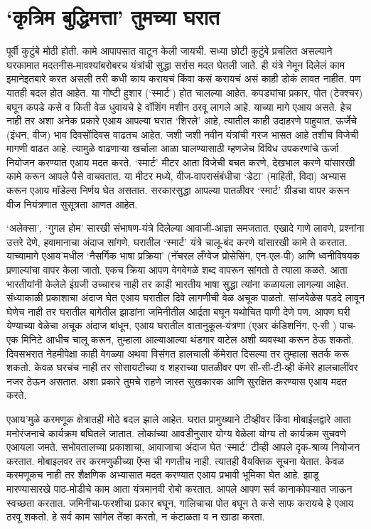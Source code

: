 \chapter{`कृत्रिम बुद्धिमत्ता' तुमच्या घरात}

पूर्वी कुटुंबे मोठी होती. कामे आपापसात वाटून केली जायची. सध्या छोटी कुटुंबे प्रचलित असल्याने घरकामात मदतनीस-मावश्यांबरोबरच यंत्रांची सुद्धा सर्रास मदत घेतली जाते. ही यंत्रे नेमून दिलेलं काम इमानेइतबारे करत असली तरी कधी काय करायचं किंवा कसं करायचं असं काही डोकं लावत नाहीत. पण यातही बदल होत आहेत. या गोष्टी हुशार (`स्मार्ट') होत चालल्या आहेत. कपड्यांचा प्रकार, पोत (टेक्श्चर) बघून कपडे कसे व किती वेळ धुवायचे हे वॉशिंग मशीन ठरवू लागले आहे. याच्या मागे एआय असते. हेच नाही तर अशा अनेक प्रकारे एआय आपल्या घरात `शिरले' आहे, त्यातील काही उदाहरणे पाहुयात. ऊर्जेचे (इंधन, वीज) भाव दिवसोंदिवस वाढतच आहेत. जशी जशी नवीन यंत्रांची गरज भासत आहे तशीच विजेची मागणी वाढत आहे. त्यामुळे वाढणाऱ्या खर्चाला आळा घालण्यासाठी म्हणजेच विविध उपकरणांचे ऊर्जा नियोजन करण्यात एआय मदत करते. `स्मार्ट' मीटर आता विजेची बचत करणे, देखभाल करणे यांसारखी कामे करून आपले पैसे वाचवतात. या मीटर मध्ये, वीज-वापरासंबंधीचा `डेटा' (माहिती, विदा) अभ्यास करून एआय मॉडेल्स निर्णय घेत असतात. सरकारसुद्धा आपल्या पातळीवर `स्मार्ट' ग्रीडचा वापर करून वीज नियंत्रणात सुसूत्रता आणत आहेत.

`अलेक्सा', `गुगल होम' सारखी संभाषण-यंत्रे दिलेल्या आवाजी-आज्ञा समजतात. एखादे गाणे लावणे, प्रश्नांना उत्तरे देणे, हवामानाचा अंदाज सांगणे, घरातील `स्मार्ट' यंत्रे चालू-बंद करणे यांसारखी कामे ते करतात. याच्यामागे एआय'मधील `नैसर्गिक भाषा प्रक्रिया' (नॅचरल लँग्वेज प्रोसेसिंग, एन-एल-पी) आणि ध्वनीविषयक प्रणाल्यांचा वापर केला जातो. एकच क्रिया आपण वेगवेगळे शब्द वापरून सांगतो ते त्याला कळते. आता भारतीयांनी केलेले इंग्रजी उच्चारच नाही तर काही भारतीय भाषा सुद्धा त्यांना कळायला लागल्या आहेत. संध्याकाळी प्रकाशाचा अंदाज घेत एआय घरातील दिवे लागणीची वेळ अचूक पाळतो. सांजवेळेस पडदे लावून घेणेच नाही तर घरातील बागेतील झाडांना जमिनीतील आर्द्रता बघून यथोचित पाणी देणे पण. आपण घरी येण्याच्या वेळेचा अचूक अंदाज बांधून, एआय घरातील वातानुकूल-यंत्रणा (एअर कंडिशनिंग, ए-सी ) पाच-एक मिनिटे आधीच चालू करून, तुम्हाला आल्याआल्या थंडगार वाटेल अशी व्यवस्था करून ठेऊ शकतो. दिवसभरात नेहमीपेक्षा काही वेगळ्या अथवा विसंगत हालचाली कॅमेरात दिसल्या तर तुम्हाला सतर्क करू शकतो. केवळ घरचंच नाही तर सोसायटीच्या व शहराच्या पातळीवर पण सी-सी-टी-व्ही कॅमेरे हालचालींवर नजर ठेऊन असतात. अशा प्रकारे तुमचे राहणे जास्त सुखकारक आणि सुरक्षित करण्यास एआय मदत करते.

एआय'मुळे करमणूक क्षेत्रातही मोठे बदल झाले आहेत. घरात प्रामुख्याने टीव्हीवर किंवा मोबाईलद्वारे आता मनोरंजनाचे कार्यक्रम बघितले जातात. लोकांच्या आवडीनुसार योग्य वेळेला योग्य तो कार्यक्रम सुचवणे एआयला जमते. सभोवतालच्या प्रकाशाचा, आवाजाचा अंदाज घेत `स्मार्ट' टीव्ही आपले दृक-श्राव्य नियोजन करतात. मोबाइलवर तर करमणुकीच्या ऍप्स ची गणतीच नाही. त्यातही वैयक्तिक सूचना येतात. केवळ करमणूकच नाही तर शैक्षणिक अभ्यासात मदत करण्यात एआय प्रभावी भूमिका घेत आहे. झाडू मारण्यासारखे पाठ-मोडीचे काम आता यंत्रमानवी रोबो करतात. आपले आपण सर्व कानाकोपऱ्यात जाऊन स्वच्छता करतात. जमिनीचा-फरशीचा प्रकार बघून, गालिचाचा पोत बघून ते कसे साफ करायचे हे एआय ठरवू शकतो. हे सर्व काम सांगेल तेंव्हा करतो, न कंटाळता व न खाडा करता.

